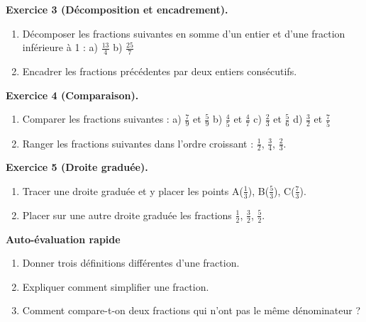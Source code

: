 \begin{exercisebox}
\textbf{Exercice 3 (Décomposition et encadrement).}
\begin{enumerate}
  \item Décomposer les fractions suivantes en somme d'un entier et d'une fraction inférieure à 1 :
    a) $\frac{13}{4}$
    b) $\frac{25}{7}$
  \item Encadrer les fractions précédentes par deux entiers consécutifs.
\end{enumerate}
\end{exercisebox}

\begin{exercisebox}
\textbf{Exercice 4 (Comparaison).}
\begin{enumerate}
  \item Comparer les fractions suivantes :
    a) $\frac{7}{9}$ et $\frac{5}{9}$
    b) $\frac{4}{5}$ et $\frac{4}{7}$
    c) $\frac{2}{3}$ et $\frac{5}{6}$
    d) $\frac{3}{2}$ et $\frac{7}{5}$
  \item Ranger les fractions suivantes dans l'ordre croissant : $\frac{1}{2}$, $\frac{3}{4}$, $\frac{2}{3}$.
\end{enumerate}
\end{exercisebox}

\begin{exercisebox}
\textbf{Exercice 5 (Droite graduée).}
\begin{enumerate}
  \item Tracer une droite graduée et y placer les points A($\frac{1}{3}$), B($\frac{5}{3}$), C($\frac{7}{3}$). 
  \item Placer sur une autre droite graduée les fractions $\frac{1}{2}$, $\frac{3}{2}$, $\frac{5}{2}$.
\end{enumerate}
\end{exercisebox}

\begin{quizbox}
\textbf{Auto-évaluation rapide}
\begin{enumerate}[label=\arabic*)]
  \item Donner trois définitions différentes d'une fraction.
  \item Expliquer comment simplifier une fraction.
  \item Comment compare-t-on deux fractions qui n'ont pas le même dénominateur ?
\end{enumerate}
\end{quizbox}

